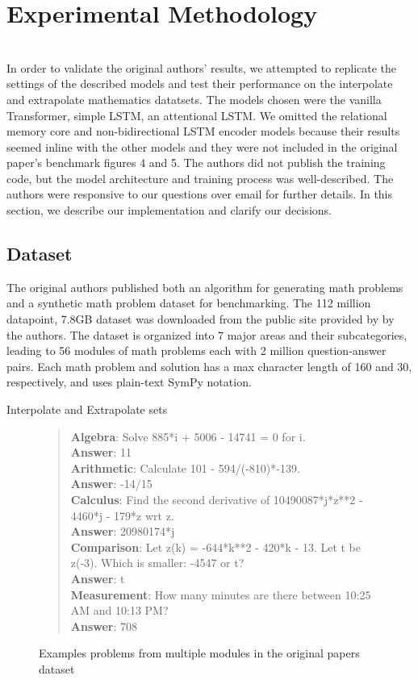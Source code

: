 \section{Experimental Methodology} \\
In order to validate the original authors’ results, we attempted to replicate the settings of the described models and test their performance on the interpolate and extrapolate mathematics datatsets. The models chosen were the vanilla Transformer\supercite{vaswani2017attention}, simple LSTM, an attentional LSTM. We omitted the relational memory core and non-bidirectional LSTM encoder models because their results seemed inline with the other models and they were not included in the original paper’s benchmark figures 4 and 5. The authors did not publish the training code, but the model architecture and training process was well-described. The authors were responsive to our questions over email for further details. In this section, we describe our implementation and clarify our decisions.

\subsection{Dataset \\}
The original authors published both an algorithm for generating math problems and a synthetic math problem dataset for benchmarking. The 112 million datapoint, 7.8GB dataset was downloaded from the public site provided by by the authors\supercite{dataset}. The dataset is organized into 7 major areas and their subcategories, leading to 56 modules of math problems each with 2 million question-answer pairs. Each math problem and solution has a max character length of 160 and 30, respectively, and uses plain-text SymPy\supercite{sympy} notation.

Interpolate and Extrapolate sets

\begin{figure}[h]
\begin{verse}{}
\textbf{Algebra}: Solve 885*i + 5006 - 14741 = 0 for i.  \\
\textbf{Answer}: 11 \\
\textbf{Arithmetic}: Calculate 101 - 594/(-810)*-139. \\
\textbf{Answer}: -14/15 \\
\textbf{Calculus}: Find the second derivative of 10490087*j*z**2 - 4460*j - 179*z wrt z.\\
\textbf{Answer}: 20980174*j \\
\textbf{Comparison}: Let z(k) = -644*k**2 - 420*k - 13. Let t be z(-3). Which is smaller: -4547 or t?\\
\textbf{Answer}: t\\
\textbf{Measurement}: How many minutes are there between 10:25 AM and 10:13 PM?\\
\textbf{Answer}: 708\\


\end{verse}
\caption{Examples problems from multiple modules in the original papers dataset}
\end{figure}
 
